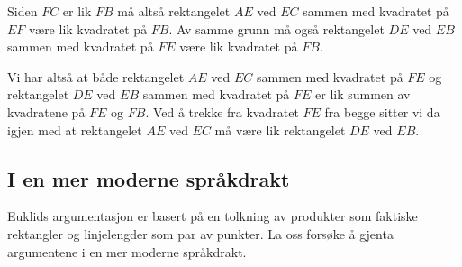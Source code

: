 \documentclass[norsk,twoside,utf8]{article}
\begin{document}
Siden $FC$ er lik $FB$ må altså rektangelet $AE$ ved $EC$ sammen med kvadratet på $EF$ være lik kvadratet på $FB$. Av samme grunn må også rektangelet $DE$ ved $EB$ sammen med kvadratet på $FE$ være lik kvadratet på $FB$. 

Vi har altså at både rektangelet $AE$ ved $EC$ sammen med kvadratet på $FE$ og rektangelet $DE$ ved $EB$ sammen med kvadratet på $FE$ er lik summen av kvadratene på $FE$ og $FB$. Ved å trekke fra kvadratet $FE$ fra begge sitter vi da igjen med at rektangelet $AE$ ved $EC$ må være lik rektangelet $DE$ ved $EB$.




\begin{center}
\end{center}


\subsection{I en mer moderne språkdrakt}
Euklids argumentasjon er basert på en tolkning av produkter som faktiske rektangler og linjelengder som par av punkter. La oss forsøke å gjenta argumentene i en mer moderne språkdrakt. \newline
\end{document}
